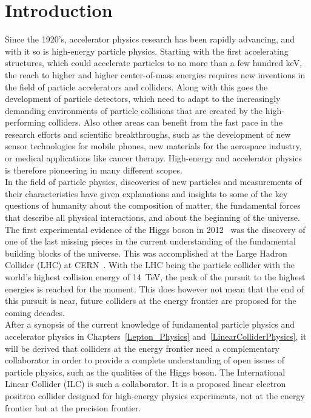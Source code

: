 \chapter{Introduction}
\label{Introduction}
Since the 1920's, accelerator physics research has been rapidly advancing, and with it so is high-energy particle physics.
Starting with the first accelerating structures, which could accelerate particles to no more than a few hundred \si{\keV}, the reach to higher and higher center-of-mass energies requires new inventions in the field of particle accelerators and colliders.
Along with this goes the development of particle detectors, which need to adapt to the increasingly demanding environments of particle collisions that are created by the high-performing colliders.
Also other areas can benefit from the fast pace in the research efforts and scientific breakthroughs, such as the development of new sensor technologies for mobile phones, new materials for the aerospace industry, or medical applications like cancer therapy.
High-energy and accelerator physics is therefore pioneering in many different scopes.
\\In the field of particle physics, discoveries of new particles and measurements of their characteristics have given explanations and insights to some of the key questions of humanity about the composition of matter, the fundamental forces that describe all physical interactions, and about the beginning of the universe.
The first experimental evidence of the Higgs boson in 2012~\cite{Higgs,Higgs2} was the discovery of one of the last missing pieces in the current understanding of the fundamental building blocks of the universe.
This was accomplished at the Large Hadron Collider (LHC) at CERN~\cite{LHC_CERN}.
With the LHC being the particle collider with the world's highest collision energy of \SI{14}{\TeV}, the peak of the pursuit to the highest energies is reached for the moment.
This does however not mean that the end of this pursuit is near, future colliders at the energy frontier are proposed for the coming decades.
\\After a synopsis of the current knowledge of fundamental particle physics and accelerator physics in Chapters~\ref{Lepton_Physics} and~\ref{LinearColliderPhysics}, it will be derived that colliders at the energy frontier need a complementary collaborator in order to provide a complete understanding of open issues of particle physics, such as the qualities of the Higgs boson.
The International Linear Collider (ILC) is such a collaborator.
It is a proposed linear electron positron collider designed for high-energy physics experiments, not at the energy frontier but at the precision frontier.
